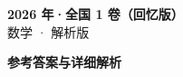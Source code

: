 \documentclass[zihao=-4, a4paper]{ctexart}
\begin{document}
\begin{center}
  {\Large\bfseries 2026 年·全国 1 卷（回忆版）}\\[4pt]
  {\large 数学 · 解析版}
\end{center}
\medskip
{}

\clearpage
{}
\begin{center}{\Large\bfseries 参考答案与详细解析}\end{center}
\medskip

\end{document}
